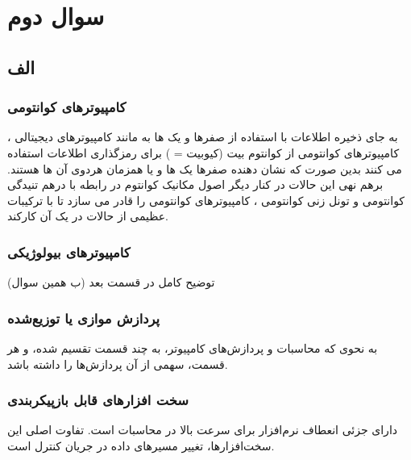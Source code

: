 \documentclass{article}
\begin{document}
\section{سوال دوم}
\subsection{الف}
\subsubsection{کامپیوترهای کوانتومی}
به جای ذخیره اطلاعات با استفاده از صفرها و یک ها به مانند کامپیوترهای دیجیتالی ، کامپیوترهای کوانتومی از کوانتوم بیت (کیوبیت = ) برای رمزگذاری اطلاعات استفاده می کنند بدین صورت که نشان دهنده صفرها یک ها و یا همزمان هردوی آن ها هستند. برهم نهی این حالات در کنار دیگر اصول مکانیک کوانتوم در رابطه با درهم تنیدگی کوانتومی و تونل زنی کوانتومی ، کامپیوترهای کوانتومی را قادر می سازد تا با ترکیبات عظیمی از حالات در یک آن کارکند.
\subsubsection{کامپیوترهای بیولوژیکی}
توضیح کامل در قسمت بعد (ب همین سوال)
\subsubsection{پردازش موازی یا توزیع‌شده}
به نحوی که محاسبات و پردازش‌های کامپیوتر، به چند قسمت تقسیم شده، و هر قسمت، سهمی از آن پردازش‌ها را داشته باشد.
\subsubsection{سخت افزارهای قابل بازپیکربندی}
 دارای جزئی انعطاف نرم‌افزار برای سرعت بالا در محاسبات است. تفاوت اصلی این سخت‌افزارها، تغییر مسیرهای داده در جریان کنترل است.
\end{document}
